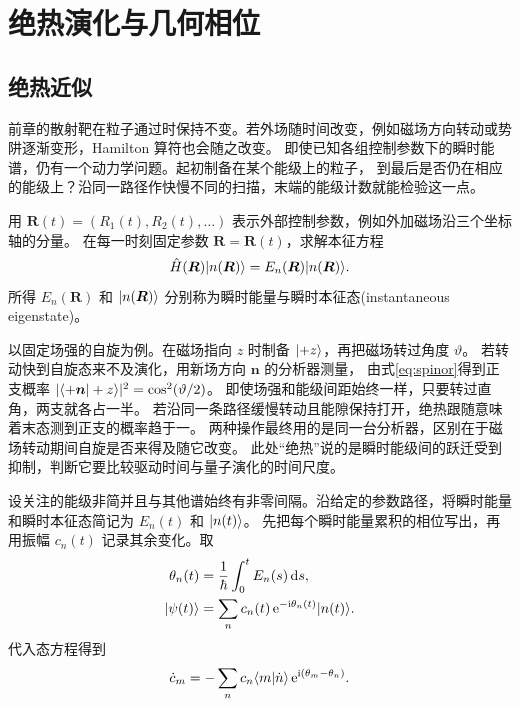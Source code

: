 \chapter{绝热演化与几何相位}
\label{ch:adiabatic}

\section{绝热近似}
前章的散射靶在粒子通过时保持不变。若外场随时间改变，例如磁场方向转动或势阱逐渐变形，Hamilton 算符也会随之改变。
即使已知各组控制参数下的瞬时能谱，仍有一个动力学问题。起初制备在某个能级上的粒子，
到最后是否仍在相应的能级上？沿同一路径作快慢不同的扫描，末端的能级计数就能检验这一点。

用 $\bm R(t) = (R_1(t),R_2(t),\ldots)$ 表示外部控制参数，例如外加磁场沿三个坐标轴的分量。
在每一时刻固定参数 $\bm R = \bm R(t)$，求解本征方程
\begin{equation}
    \hat{H}(\bm R)\lvert n(\bm R)\rangle = E_n(\bm R)\lvert n(\bm R)\rangle .
    \label{eq:instantaneous-eigenstate}
\end{equation}
所得 $E_n(\bm R)$ 和 $\lvert n(\bm R)\rangle$ 分别称为瞬时能量与瞬时本征态(instantaneous eigenstate)。

以固定场强的自旋为例。在磁场指向 $z$ 时制备 $\lvert+z\rangle$，再把磁场转过角度 $\vartheta$。
若转动快到自旋态来不及演化，用新场方向 $\bm n$ 的分析器测量，
由式\eqref{eq:spinor}得到正支概率 $\lvert\langle+\bm n\vert+z\rangle\rvert^2 = \cos^2(\vartheta/2)$。
即使场强和能级间距始终一样，只要转过直角，两支就各占一半。
若沿同一条路径缓慢转动且能隙保持打开，绝热跟随意味着末态测到正支的概率趋于一。
两种操作最终用的是同一台分析器，区别在于磁场转动期间自旋是否来得及随它改变。
此处“绝热”说的是瞬时能级间的跃迁受到抑制，判断它要比较驱动时间与量子演化的时间尺度。

设关注的能级非简并且与其他谱始终有非零间隔。沿给定的参数路径，将瞬时能量和瞬时本征态简记为 $E_n(t)$ 和 $\lvert n(t)\rangle$。
先把每个瞬时能量累积的相位写出，再用振幅 $c_n(t)$ 记录其余变化。取
\begin{subequations}
    \begin{align}
        \theta_n(t) &= \frac1\hbar\int_0^t E_n(s)\mathop{}\!\mathrm{d} s,\\
        \lvert\psi(t)\rangle &= \sum_n c_n(t)\mathop{}\!\mathrm{e}^{-\mathrm{i}\theta_n(t)}\lvert n(t)\rangle.
    \end{align}
\end{subequations}
代入态方程得到
\begin{equation}
    \dot c_m = -\sum_n c_n\langle m\vert\dot n\rangle\mathop{}\!\mathrm{e}^{\mathrm{i}(\theta_m-\theta_n)} .
\end{equation}

